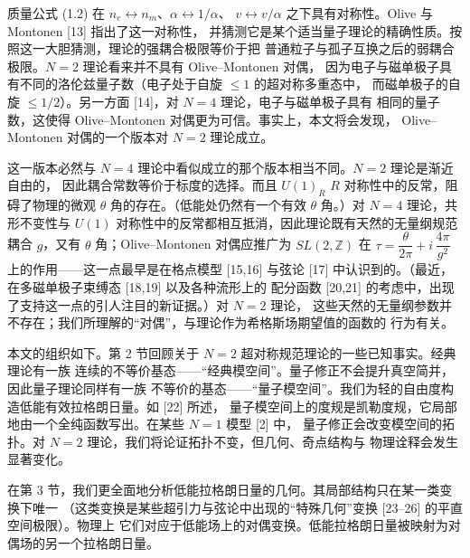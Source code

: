 \documentclass[11pt,a4paper,UTF8,fontset=fandol]{ctexart}
\theoremstyle{plain}
\theoremstyle{definition}
\newcommand{\Z}{\mathbb{Z}}
\renewcommand{\Im}{\operatorname{Im}}
\newcommand{\Nc}{\mathcal{N}}
\def\Nc{N}%
\begin{document}
质量公式 (1.2) 在 $n_e\leftrightarrow n_m$、$\alpha\leftrightarrow 1/\alpha$、
$v\leftrightarrow v/\alpha$ 之下具有对称性。Olive 与 Montonen [13] 指出了这一对称性，
并猜测它是某个适当量子理论的精确性质。按照这一大胆猜测，理论的强耦合极限等价于把
普通粒子与孤子互换之后的弱耦合极限。$\Nc=2$ 理论看来并不具有 Olive--Montonen 对偶，
因为电子与磁单极子具有不同的洛伦兹量子数（电子处于自旋 $\le 1$ 的超对称多重态中，
而磁单极子的自旋 $\le 1/2$）。另一方面 [14]，对 $\Nc=4$ 理论，电子与磁单极子具有
相同的量子数，这使得 Olive--Montonen 对偶更为可信。事实上，本文将会发现，
Olive--Montonen 对偶的一个版本对 $\Nc=2$ 理论成立。

这一版本必然与 $\Nc=4$ 理论中看似成立的那个版本相当不同。$\Nc=2$ 理论是渐近自由的，
因此耦合常数等价于标度的选择。而且 $U(1)_R$ $R$ 对称性中的反常，阻碍了物理的微观
$\theta$ 角的存在。（低能处仍然有一个有效 $\theta$ 角。）对 $\Nc=4$ 理论，共形不变性与
$U(1)$ 对称性中的反常都相互抵消，因此理论既有天然的无量纲规范耦合 $g$，又有 $\theta$
角；Olive--Montonen 对偶应推广为 $SL(2,\Z)$ 在
$\tau=\dfrac{\theta}{2\pi}+i\,\dfrac{4\pi}{g^2}$ 上的作用——这一点最早是在格点模型
[15,16] 与弦论 [17] 中认识到的。（最近，在多磁单极子束缚态 [18,19] 以及各种流形上的
配分函数 [20,21] 的考虑中，出现了支持这一点的引人注目的新证据。）对 $\Nc=2$ 理论，
这些天然的无量纲参数并不存在；我们所理解的“对偶”，与理论作为希格斯场期望值的函数的
行为有关。

本文的组织如下。第 2 节回顾关于 $\Nc=2$ 超对称规范理论的一些已知事实。经典理论有一族
连续的不等价基态——“经典模空间”。量子修正不会提升真空简并，因此量子理论同样有一族
不等价的基态——“量子模空间”。我们为轻的自由度构造低能有效拉格朗日量。如 [22] 所述，
量子模空间上的度规是凯勒度规，它局部地由一个全纯函数写出。在某些 $\Nc=1$ 模型 [2] 中，
量子修正会改变模空间的拓扑。对 $\Nc=2$ 理论，我们将论证拓扑不变，但几何、奇点结构与
物理诠释会发生显著变化。

在第 3 节，我们更全面地分析低能拉格朗日量的几何。其局部结构只在某一类变换下唯一
（这类变换是某些超引力与弦论中出现的“特殊几何”变换 [23--26] 的平直空间极限）。物理上
它们对应于低能场上的对偶变换。低能拉格朗日量被映射为对偶场的另一个拉格朗日量。
\end{document}
